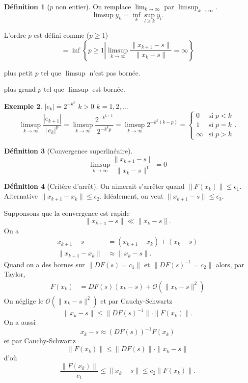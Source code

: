 \documentclass[11pt,a4paper]{article}
\theoremstyle{definition}
\newtheorem{mydef}{Définition}
\newtheorem{myexem}[mydef]{Exemple}
\newcommand{\bigoh}{\mathcal{O}}
\begin{document}
\begin{mydef}[$p$ non entier]
  On remplace $\lim_{k\to\infty}$ par $\limsup_{k\to\infty}$.
  $$ \limsup y_k = \inf_{k} \sup_{l \geq k} y_l. $$

  L'ordre $p$ est défini comme ($p \geq 1$)
  $$ = \inf\left\{p \geq 1 \left|
  \limsup_{k\to\infty} \frac{\|x_{k+1}-s\|}{\|x_k-s\|}
  = \infty\right.\right\}$$

  plus petit $p$ tel que $\limsup$ n'est pas bornée.

  plus grand $p$ tel que $\limsup$ est bornée.
\end{mydef}
\begin{myexem}
  $|e_k| = 2^{-k^k}$ $k > 0$ $k = 1,2,\ldots$
  $$\limsup_{k\to\infty} \frac{|e_{k+1}|}{|e_k|^p}
  = \limsup_{k\to\infty} \frac{2^{-k^{k+1}}}{2^{-k^kp}}
  = \limsup_{k\to\infty} 2^{-k^k(k-p)} =
  \begin{cases}
    0 & \text{si } p < k\\
    1 & \text{si } p = k\\
    \infty & \text{si } p > k
  \end{cases}.$$
\end{myexem}

\begin{mydef}[Convergence superlinéaire]
  $$\limsup_{k\to\infty} \frac{\|x_{k+1}-s\|}{\|x_k-s\|^1} = 0$$
\end{mydef}

\begin{mydef}[Critère d'arrêt]
  On aimerait s'arrêter quand $\|F(x_k)\| \leq \epsilon_1$.
  Alternative $\|x_{k+1}-x_k\| \leq \epsilon_2$.
  Idéalement, on veut $\|x_{k+1}-s\| \leq \epsilon_3$.

  Supponsons que la convergence est rapide
  $$\|x_{k+1}-s\| \ll \|x_k-s\|.$$
  On a
  \begin{align*}
    x_{k+1} - s & = (x_{k+1} - x_k) + (x_k -s)\\
    \|x_{k+1} - x_k\| & \approx \|x_k - s\|.
  \end{align*}
  Quand on a des bornes sur $\|DF(s)=c_1\|$ et $\|DF(s)^{-1}=c_2\|$ alors, par Taylor,
  \begin{align*}
    F(x_k) & = DF(s)(x_k-s) + \bigoh(\|x_k-s\|^2)
  \end{align*}
  On néglige le $\bigoh(\|x_k-s\|^2)$ et par Cauchy-Schwartz
  \[ \|x_k-s\| \leq \|DF(s)^{-1}\|\cdot\|F(x_k)\|. \]
  On a aussi
  \[ x_k - s \approx (DF(s))^{-1}F(x_k) \]
  et par Cauchy-Schwartz
  \[ \|F(x_k)\| \leq \|DF(s)\|\cdot\|x_k-s\| \]
  d'où
  \[ \frac{\|F(x_k)\|}{c_1} \leq \|x_k-s\| \leq c_2\|F(x_k)\|. \]
\end{mydef}
\end{document}
